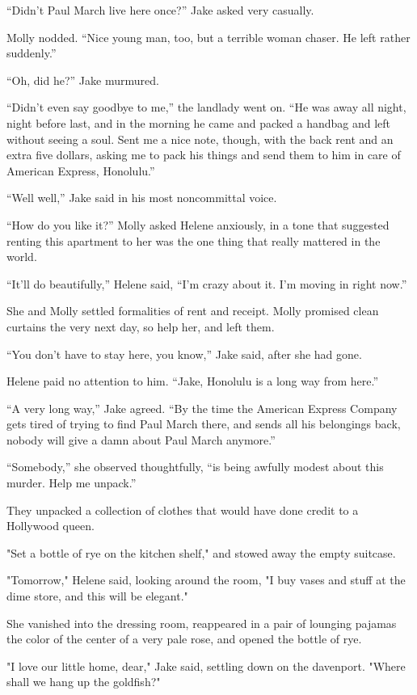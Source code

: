 \documentclass{novel}
\begin{document}
“Didn’t Paul March live here once?” Jake asked very casually.

Molly nodded. “Nice young man, too, but a terrible woman chaser. He left rather suddenly.”

“Oh, did he?” Jake murmured.

“Didn’t even say goodbye to me,” the landlady went on. “He was away all night, night before last, and in the morning he came and packed a handbag and left without seeing a soul. Sent me a nice note, though, with the back rent and an extra five dollars, asking me to pack his things and send them to him in care of American Express, Honolulu.”

“Well well,” Jake said in his most noncommittal voice.

“How do you like it?” Molly asked Helene anxiously, in a tone that suggested renting this apartment to her was the one thing that really mattered in the world.

“It’ll do beautifully,” Helene said, “I’m crazy about it. I’m moving in right now.”

She and Molly settled formalities of rent and receipt. Molly promised clean curtains the very next day, so help her, and left them.

“You don’t have to stay here, you know,” Jake said, after she had gone.

Helene paid no attention to him. “Jake, Honolulu is a long way from here.”

“A very long way,” Jake agreed. “By the time the American Express Company gets tired of trying to find Paul March there, and sends all his belongings back, nobody will give a damn about Paul March anymore.”

“Somebody,” she observed thoughtfully, “is being awfully modest about this murder. Help me unpack.”

They unpacked a collection of clothes that would have done credit to a Hollywood queen.

"Set a bottle of rye on the kitchen shelf," and stowed away the empty suitcase.

"Tomorrow," Helene said, looking around the room, "I buy vases and stuff at the dime store, and this will be elegant."

She vanished into the dressing room, reappeared in a pair of lounging pajamas the color of the center of a very pale rose, and opened the bottle of rye.

"I love our little home, dear," Jake said, settling down on the davenport. "Where shall we hang up the goldfish?"
\end{document}

